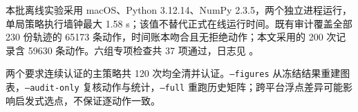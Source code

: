 本批离线实验采用 macOS、Python 3.12.14、NumPy 2.3.5，两个独立进程运行，单局策略执行墙钟最大 1.58 s；该值不替代正式在线运行时间。既有审计覆盖全部 230 份轨迹的 65173 条动作，时间账本吻合且无拒绝动作；本文采用的 200 次记录含 59630 条动作。六组专项检查共 37 项通过，日志见 。

两个要求连续认证的主策略共 120 次均全清并认证。\texttt{--figures} 从冻结结果重建图表，\texttt{--audit-only} 复核动作与统计，\texttt{--full} 重跑历史矩阵；跨平台浮点差异可能影响启发式选点，不保证逐动作一致。
